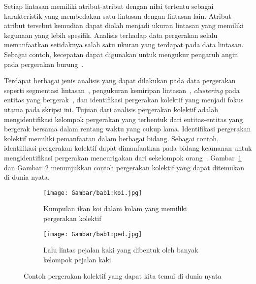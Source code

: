Setiap lintasan memiliki atribut-atribut dengan nilai tertentu sebagai karakteristik yang membedakan satu lintasan dengan lintasan lain. Atribut-atribut tersebut kemudian dapat diolah menjadi ukuran lintasan yang memiliki kegunaan yang lebih spesifik. Analisis terhadap data pergerakan selalu memanfaatkan setidaknya salah satu ukuran yang terdapat pada data lintasan. Sebagai contoh, kecepatan dapat digunakan untuk mengukur pengaruh angin pada pergerakan burung~\cite{safi:speed}.

\iffalse \lionov{jadiin paragraf baru, kan ini beda topik} \fi

Terdapat berbagai jenis analisis yang dapat dilakukan pada data pergerakan seperti segmentasi lintasan~\cite{mann:01:segmentation}, pengukuran kemiripan lintasan~\cite{rote:01:hausdorff, alt:01:frechet, muller:dtw}, \textit{clustering} pada entitas yang bergerak~\cite{lee:01:clustering}, dan identifikasi pergerakan kolektif yang menjadi fokus utama pada skripsi ini. Tujuan dari analisis pergerakan kolektif adalah mengidentifikasi kelompok pergerakan yang terbentuk dari entitas-entitas yang bergerak bersama dalam rentang waktu yang cukup lama. Identifikasi pergerakan kolektif memiliki pemanfaatan dalam berbagai bidang. Sebagai contoh, identifikasi pergerakan kolektif dapat dimanfaatkan pada bidang keamanan untuk mengidentifikasi pergerakan mencurigakan dari sekelompok orang~\cite{makris:01:security}. Gambar~\ref{bab1:koi} dan Gambar~\ref{bab1:ped} menunjukkan contoh pergerakan kolektif yang dapat ditemukan di dunia nyata.

\begin{figure}[h]
    \centering
    \begin{subfigure}[h]{0.45\textwidth}
        \centering
        \texttt{[image: Gambar/bab1:koi.jpg]}
        \caption{Kumpulan ikan koi dalam kolam yang memiliki pergerakan kolektif\protect\footnotemark[6]}
        \label{bab1:koi}
    \end{subfigure} \hspace{0.5cm}
    \begin{subfigure}[h]{0.45\textwidth}
        \centering
        \texttt{[image: Gambar/bab1:ped.jpg]}
        \caption{Lalu lintas pejalan kaki yang dibentuk oleh banyak kelompok pejalan kaki\protect\footnotemark[7]}
        \label{bab1:ped}
    \end{subfigure}
    \caption[Pergerakan kolektif dunia nyata]{Contoh pergerakan kolektif yang dapat kita temui di dunia nyata}
    \label{bab1:collective-movement}
\end{figure}

